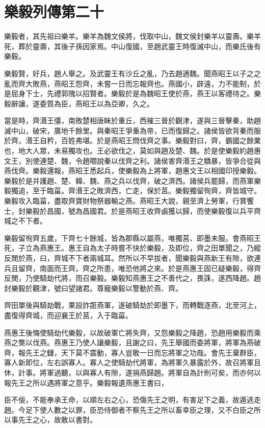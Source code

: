 \chapter{樂毅列傳第二十}

樂毅者，其先祖曰樂羊。樂羊為魏文侯將，伐取中山，魏文侯封樂羊以靈壽。樂羊死，葬於靈壽，其後子孫因家焉。中山復國，至趙武靈王時復滅中山，而樂氏後有樂毅。

樂毅賢，好兵，趙人舉之。及武靈王有沙丘之亂，乃去趙適魏。聞燕昭王以子之之亂而齊大敗燕，燕昭王怨齊，未嘗一日而忘報齊也。燕國小，辟遠，力不能制，於是屈身下士，先禮郭隗以招賢者。樂毅於是為魏昭王使於燕，燕王以客禮待之。樂毅辭讓，遂委質為臣，燕昭王以為亞卿，久之。

當是時，齊湣王彊，南敗楚相唐眛於重丘，西摧三晉於觀津，遂與三晉擊秦，助趙滅中山，破宋，廣地千餘里。與秦昭王爭重為帝，已而復歸之。諸侯皆欲背秦而服於齊。湣王自矜，百姓弗堪。於是燕昭王問伐齊之事。樂毅對曰，齊，霸國之餘業也，地大人眾，未易獨攻也。王必欲伐之，莫如與趙及楚、魏。於是使樂毅約趙惠文王，別使連楚、魏，令趙嚪說秦以伐齊之利。諸侯害齊湣王之驕暴，皆爭合從與燕伐齊。樂毅還報，燕昭王悉起兵，使樂毅為上將軍，趙惠文王以相國印授樂毅。樂毅於是并護趙、楚、韓、魏、燕之兵以伐齊，破之濟西。諸侯兵罷歸，而燕軍樂毅獨追，至于臨菑。齊湣王之敗濟西，亡走，保於莒。樂毅獨留徇齊，齊皆城守。樂毅攻入臨菑，盡取齊寶財物祭器輸之燕。燕昭王大說，親至濟上勞軍，行賞饗士，封樂毅於昌國，號為昌國君。於是燕昭王收齊鹵獲以歸，而使樂毅復以兵平齊城之不下者。

樂毅留徇齊五歲，下齊七十餘城，皆為郡縣以屬燕，唯獨莒、即墨未服。會燕昭王死，子立為燕惠王。惠王自為太子時嘗不快於樂毅，及即位，齊之田單聞之，乃縱反閒於燕，曰，齊城不下者兩城耳。然所以不早拔者，聞樂毅與燕新王有隙，欲連兵且留齊，南面而王齊。齊之所患，唯恐他將之來。於是燕惠王固已疑樂毅，得齊反閒，乃使騎劫代將，而召樂毅。樂毅知燕惠王之不善代之，畏誅，遂西降趙。趙封樂毅於觀津，號曰望諸君。尊寵樂毅以警動於燕、齊。

齊田單後與騎劫戰，果設詐誑燕軍，遂破騎劫於即墨下，而轉戰逐燕，北至河上，盡復得齊城，而迎襄王於莒，入于臨菑。

燕惠王後悔使騎劫代樂毅，以故破軍亡將失齊，又怨樂毅之降趙，恐趙用樂毅而乘燕之獘以伐燕。燕惠王乃使人讓樂毅，且謝之曰，先王舉國而委將軍，將軍為燕破齊，報先王之讎，天下莫不震動，寡人豈敢一日而忘將軍之功哉。會先王棄群臣，寡人新即位，左右誤寡人。寡人之使騎劫代將軍，為將軍久暴露於外，故召將軍且休，計事。將軍過聽，以與寡人有隙，遂捐燕歸趙。將軍自為計則可矣，而亦何以報先王之所以遇將軍之意乎。樂毅報遺燕惠王書曰，

臣不佞，不能奉承王命，以順左右之心，恐傷先王之明，有害足下之義，故遁逃走趙。今足下使人數之以罪，臣恐侍御者不察先王之所以畜幸臣之理，又不白臣之所以事先王之心，故敢以書對。


